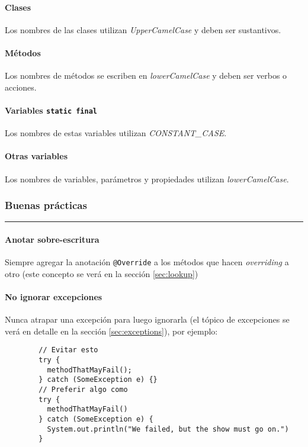     \paragraph{Clases}
      Los nombres de las clases utilizan \textit{UpperCamelCase} y deben ser sustantivos.
    \paragraph{Métodos}
      Los nombres de métodos se escriben en \textit{lowerCamelCase} y deben ser verbos o 
      acciones.
    \paragraph{Variables \texttt{static final}}
      Los nombres de estas variables utilizan \textit{CONSTANT\_CASE}.
    \paragraph{Otras variables}
      Los nombres de variables, parámetros y propiedades utilizan \textit{lowerCamelCase}.
  \subsubsection{Buenas prácticas}
    \vspace{-3ex}\rule{\linewidth}{1pt}

    \paragraph{Anotar sobre-escritura}
      Siempre agregar la anotación \texttt{@Override} a los métodos que hacen 
      \textit{overriding} a otro (este concepto se verá en la sección \ref{sec:lookup})
    \paragraph{No ignorar excepciones}
      Nunca atrapar una excepción para luego ignorarla (el tópico de excepciones se verá 
      en detalle en la sección \ref{sec:exceptions}), por ejemplo:

      \begin{verbatim}
        // Evitar esto
        try {
          methodThatMayFail();
        } catch (SomeException e) {}
        // Preferir algo como
        try {
          methodThatMayFail()
        } catch (SomeException e) {
          System.out.println("We failed, but the show must go on.")
        }
      \end{verbatim}
